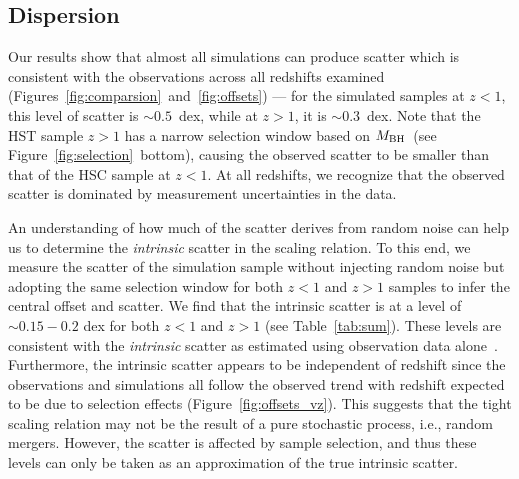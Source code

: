\documentclass[twocolumn]{aastex631}
\def\mbh{$M_{\rm BH}$}
\begin{document}
\subsection{Dispersion}

Our results show that almost all simulations can produce scatter which is consistent with the observations across all redshifts examined (Figures~\ref{fig:comparsion}~and~\ref{fig:offsets}) --- for the simulated samples at $z<1$, this level of scatter is $\sim0.5$~dex, while at $z>1$, it is $\sim0.3$~dex. Note that the HST sample $z>1$ has a narrow selection window based on \mbh\ (see Figure~\ref{fig:selection}~bottom), causing the observed scatter to be smaller than that of the HSC sample at $z<1$. At all redshifts, we recognize that the observed scatter is dominated by measurement uncertainties in the data. 

An understanding of how much of the scatter derives from random noise can help us to determine the {\it intrinsic} scatter in the scaling relation. To this end, we measure the scatter of the simulation sample without injecting random noise but adopting the same selection window for both $z<1$ and $z>1$ samples to infer the central offset and scatter. We find that the intrinsic scatter is at a level of $\sim0.15-0.2$ dex for both $z<1$ and $z>1$ (see Table~\ref{tab:sum}). These levels are consistent with the {\it intrinsic} scatter as estimated using observation data alone~\citep{Ding2020, 2021arXiv210902751L}. Furthermore, the intrinsic scatter appears to be independent of redshift since the observations and simulations all follow the observed trend with redshift expected to be due to selection effects (Figure~\ref{fig:offsets_vz}). This suggests that the tight scaling relation may not be the result of a pure stochastic process, i.e., random mergers. However, the scatter is affected by sample selection, and thus these levels can only be taken as an approximation of the true intrinsic scatter.
\end{document}
